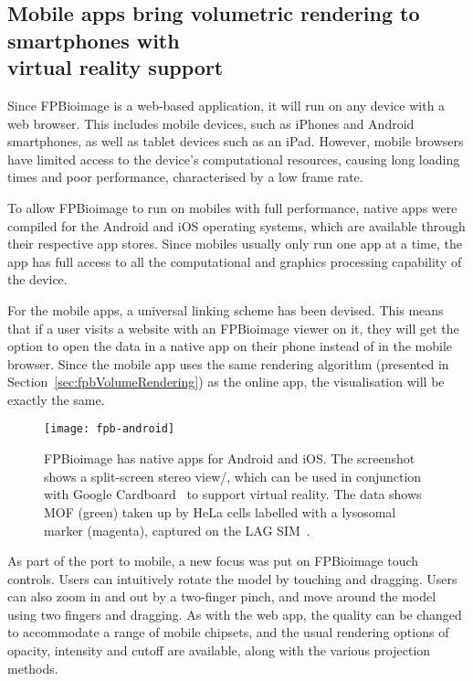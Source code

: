 \subsection[Mobile apps bring volumetric rendering to smartphones with virtual reality support]{Mobile apps bring volumetric rendering to smartphones with\\ virtual reality support}
Since FPBioimage is a web-based application, it will run on any device with a web browser.
This includes mobile devices, such as iPhones and Android smartphones, as well as tablet devices such as an iPad.
However, mobile browsers have limited access to the device's computational resources, causing long loading times and poor performance, characterised by a low frame rate.

To allow FPBioimage to run on mobiles with full performance, native apps were compiled for the Android and iOS operating systems, which are available through their respective app stores.
Since mobiles usually only run one app at a time, the app has full access to all the computational and graphics processing capability of the device.

For the mobile apps, a universal linking scheme has been devised.
This means that if a user visits a website with an FPBioimage viewer on it, they will get the option to open the data in a native app on their phone instead of in the mobile browser.
Since the mobile app uses the same rendering algorithm (presented in Section~\ref{sec:fpbVolumeRendering}) as the online app, the visualisation will be exactly the same.

\begin{figure}[t!]
\centering
\texttt{[image: fpb-android]}
\caption[FPBioimage: The FPBioimage mobile app provides volumetric rendering in virtual reality]{FPBioimage has native apps for Android and iOS. The screenshot shows a split-screen stereo view/, which can be used in conjunction with Google Cardboard~\cite{cardboard} to support virtual reality. The data shows MOF (green) taken up by HeLa cells labelled with a lysosomal marker (magenta), captured on the LAG SIM~\cite{teplensky2017temperature}. } %
\label{fig:fpbMobile}
\end{figure}

As part of the port to mobile, a new focus was put on FPBioimage touch controls.
Users can intuitively rotate the model by touching and dragging.
Users can also zoom in and out by a two-finger pinch, and move around the model using two fingers and dragging.
As with the web app, the quality can be changed to accommodate a range of mobile chipsets, and the usual rendering options of opacity, intensity and cutoff are available, along with the various projection methods.

